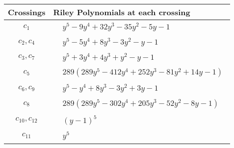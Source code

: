 \documentclass[1p]{elsarticle_modified}
\theoremstyle{definition}
\begin{document}
\begin{tabular}{m{50pt}|m{274pt}}
Crossings & \hspace{64pt}Riley Polynomials at each crossing \\
\hline $$\begin{aligned}c_{1}\end{aligned}$$&$\begin{aligned}
&y^5-9 y^4+32 y^3-35 y^2-5 y-1
\end{aligned}$\\
\hline $$\begin{aligned}c_{2},c_{4}\end{aligned}$$&$\begin{aligned}
&y^5-5 y^4+8 y^3-3 y^2- y-1
\end{aligned}$\\
\hline $$\begin{aligned}c_{3},c_{7}\end{aligned}$$&$\begin{aligned}
&y^5+3 y^4+4 y^3+y^2- y-1
\end{aligned}$\\
\hline $$\begin{aligned}c_{5}\end{aligned}$$&$\begin{aligned}
&289(289 y^5-412 y^4+252 y^3-81 y^2+14 y-1)
\end{aligned}$\\
\hline $$\begin{aligned}c_{6},c_{9}\end{aligned}$$&$\begin{aligned}
&y^5- y^4+8 y^3-3 y^2+3 y-1
\end{aligned}$\\
\hline $$\begin{aligned}c_{8}\end{aligned}$$&$\begin{aligned}
&289(289 y^5-302 y^4+205 y^3-52 y^2-8 y-1)
\end{aligned}$\\
\hline $$\begin{aligned}c_{10},c_{12}\end{aligned}$$&$\begin{aligned}
&(y-1)^5
\end{aligned}$\\
\hline $$\begin{aligned}c_{11}\end{aligned}$$&$\begin{aligned}
&y^5
\end{aligned}$\\
\hline
\end{tabular}\\~\\
\end{document}
